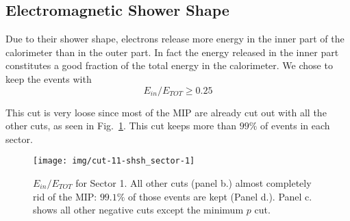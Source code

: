 \subsection{Electromagnetic Shower Shape}
\label{subsec:shsh}
Due to their shower shape, electrons release more energy in
the inner part of the calorimeter than in the outer part.
In fact the energy released in the inner part constitutes a good
fraction of the total energy in the calorimeter.
We chose to keep the events with \[E_{in}/E_{TOT} \geq 0.25\]

This cut is very loose since most of the MIP are already cut
out with all the other cuts, as seen in Fig.~\ref{fig:einetot}.
This cut keeps more than $99\%$ of events in each sector.


\begin{figure}[ht]
    \centering
    \texttt{[image: img/cut-11-shsh\_sector-1]}
    \caption{$E_{in}/E_{TOT}$ for Sector 1. All other cuts (panel b.)
        almost completely rid of the MIP: $99.1\%$ of those events are kept (Panel d.).
        Panel c. shows all other negative cuts except the minimum $p$ cut.}
    \label{fig:einetot}
\end{figure}

